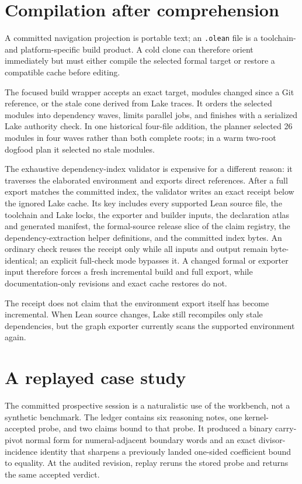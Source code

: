 \documentclass[11pt]{article}
\begin{document}
\section{Compilation after comprehension}\label{sec:incremental}

A committed navigation projection is portable text; an \texttt{.olean} file is
a toolchain- and platform-specific build product. A cold clone can therefore
orient immediately but must either compile the selected formal target or
restore a compatible cache before editing.

The focused build wrapper accepts an exact target, modules changed since a Git
reference, or the stale cone derived from Lake traces. It orders the selected
modules into dependency waves, limits parallel jobs, and finishes with a
serialized Lake authority check. In one historical four-file addition, the
planner selected 26 modules in four waves rather than both complete roots; in a
warm two-root dogfood plan it selected no stale modules.

The exhaustive dependency-index validator is expensive for a different
reason: it traverses the elaborated environment and exports direct
references. After a full export matches the committed index, the validator
writes an exact receipt below the ignored Lake cache. Its key includes every
supported Lean source file, the toolchain and Lake locks, the exporter and
builder inputs, the declaration atlas and generated manifest, the formal-source
release slice of the claim registry, the dependency-extraction helper
definitions, and the committed index bytes. An ordinary check reuses the receipt
only while all inputs and output
remain byte-identical; an explicit full-check mode bypasses it. A changed
formal or exporter input therefore forces a fresh incremental build and full
export, while documentation-only revisions and exact cache restores do not.

The receipt does not claim that the
environment export itself has become incremental. When Lean source
changes, Lake still recompiles only stale dependencies, but the graph exporter
currently scans the supported environment again.

\section{A replayed case study}\label{sec:dogfood}

The committed prospective session is a naturalistic use of the workbench, not
a synthetic benchmark. The ledger contains six reasoning notes, one
kernel-accepted probe, and two claims bound to that probe. It produced a binary
carry-pivot normal form for numeral-adjacent boundary words and an exact
divisor-incidence identity that sharpens a previously landed one-sided
coefficient bound to equality. At the audited revision, replay reruns the
stored probe and returns the same accepted verdict.
\end{document}
